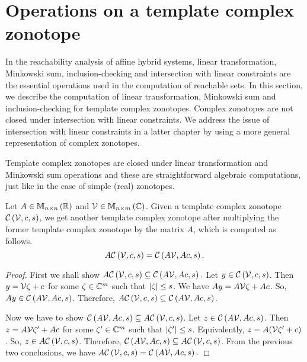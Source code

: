 \section{Operations on a template complex zonotope}
In the reachability analysis of affine hybrid systems, linear
transformation, Minkowski sum, inclusion-checking and intersection
with linear constraints are the essential operations used in the
computation of reachable sets.  In this section, we describe the
computation of linear transformation, Minkowski sum and
inclusion-checking for template complex zonotopes.  Complex zonotopes
are not closed under intersection with linear constraints.  We address
the issue of intersection with linear constraints in a latter chapter
by using a more general representation of complex zonotopes.

Template complex zonotopes are closed under linear transformation and
Minkowski sum operations and these are straightforward algebraic
computations, just like in the case of simple (real) zonotopes.
%
\begin{proposition}
Let $A\in\mathbb{M}_{n\times n}\left(\mathbb{R}\right)$ and $\mathcal{V}\in\mathbb{M}_{n\times m}\left(\mathbb{C}\right)$.
Given a template complex zonotope $\mathit{\mathcal{C}}\left(\mathcal{V},c,s\right)$, we
get another template complex zonotope after multiplying the former
template complex zonotope by the matrix $A$, which is computed as
follows.
%
\begin{equation}
A\mathit{\mathcal{C}}\left(\mathcal{V},c,s\right)=\mathit{\mathcal{C}}\left(A\mathcal{V},Ac,s\right).
\end{equation}
%
\end{proposition}
%
\begin{proof}
First we shall show
$A\mathit{\mathcal{C}}\left(\mathcal{V},c,s\right)\subseteq\mathit{\mathcal{C}}\left(A\mathcal{V},Ac,s\right).$
Let $y\in\mathit{\mathcal{C}}\left(\mathcal{V},c,s\right)$.  Then $y=\mathcal{V}\zeta+c$
for some $\zeta\in\mathbb{C}^m$ such that
$\left|\zeta\right|\leq s$.  We have $Ay=A\mathcal{V}\zeta+Ac$.  So,
$Ay\in\mathit{\mathcal{C}}\left(A\mathcal{V},Ac,s\right)$.  Therefore,
$A\mathit{\mathcal{C}}\left(\mathcal{V},c,s\right)\subseteq\mathit{\mathcal{C}}\left(A\mathcal{V},Ac,s\right).$
 
Now we have to show $\mathit{\mathcal{C}}\left(A\mathcal{V},Ac,s\right)\subseteq
A\mathit{\mathcal{C}}\left(\mathcal{V},c,s\right)$.  Let
$z\in\mathit{\mathcal{C}}\left(A\mathcal{V},Ac,s\right)$.  Then $z=A\mathcal{V}\zeta^\prime+Ac$
for some $\zeta^\prime\in\mathbb{C}^m$ such that
$\left|\zeta^\prime\right|\leq s$.  Equivalently, $z=
A(\mathcal{V}\zeta^\prime+c)$.  So, $z\in
A\mathit{\mathcal{C}}\left(\mathcal{V},c,s\right)$.  Therefore, $\mathit{\mathcal{C}}\left(A\mathcal{V},Ac,s\right)\subseteq
A\mathit{\mathcal{C}}\left(\mathcal{V},c,s\right)$.
From the previous two conclusions, we have
$A\mathit{\mathcal{C}}\left(\mathcal{V},c,s\right)=\mathit{\mathcal{C}}\left(A\mathcal{V},Ac,s\right).$
\end{proof}

